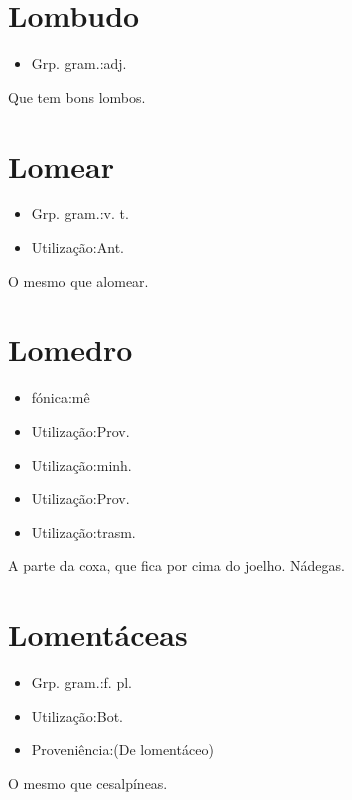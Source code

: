 \section{Lombudo}
\begin{itemize}
\item {Grp. gram.:adj.}
\end{itemize}
Que tem bons lombos.
\section{Lomear}
\begin{itemize}
\item {Grp. gram.:v. t.}
\end{itemize}
\begin{itemize}
\item {Utilização:Ant.}
\end{itemize}
O mesmo que \textunderscore alomear\textunderscore .
\section{Lomedro}
\begin{itemize}
\item {fónica:mê}
\end{itemize}
\begin{itemize}
\item {Utilização:Prov.}
\end{itemize}
\begin{itemize}
\item {Utilização:minh.}
\end{itemize}
\begin{itemize}
\item {Utilização:Prov.}
\end{itemize}
\begin{itemize}
\item {Utilização:trasm.}
\end{itemize}
A parte da coxa, que fica por cima do joelho.
Nádegas.
\section{Lomentáceas}
\begin{itemize}
\item {Grp. gram.:f. pl.}
\end{itemize}
\begin{itemize}
\item {Utilização:Bot.}
\end{itemize}
\begin{itemize}
\item {Proveniência:(De \textunderscore lomentáceo\textunderscore )}
\end{itemize}
O mesmo que cesalpíneas.
